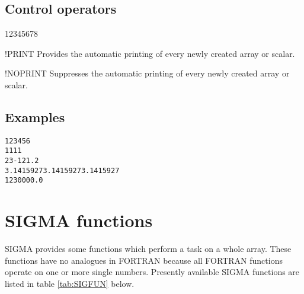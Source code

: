 \subsection{Control operators}

\begin{DLtt}{12345678}
\item[!PRINT]   Provides the automatic printing of 
                every newly created array or scalar.
\item[!NOPRINT] Suppresses the automatic printing of 
                every newly created array or scalar.
\end{DLtt}
 
\subsection*{Examples}
\begin{alltt}
             1  2  3  4  5  6
                 1  1  1  1
    2  3  -1  2  1.2
              3.1415927  3.1415927  3.1415927
           1230000.0
\end{alltt}

\section{SIGMA functions}
 
SIGMA provides some functions which perform a task on a whole array. These
functions have no analogues in FORTRAN because all FORTRAN functions operate on
one or more single numbers. Presently available SIGMA functions
are listed in table \ref{tab:SIGFUN} below.

